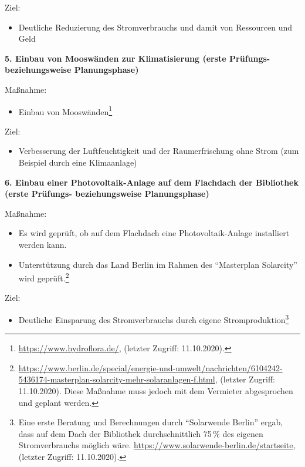 \documentclass[a4paper,
fontsize=11pt,
oneside,
numbers=noperiodatend,
parskip=half-,
bibliography=totoc,
final
]{scrartcl}
\begin{document}
Ziel:

\begin{itemize}[itemsep=-5pt]

\item
  Deutliche Reduzierung des Stromverbrauchs und damit von Ressourcen und
  Geld
\end{itemize}

\textbf{5. Einbau von Mooswänden zur Klimatisierung (erste Prüfungs-
beziehungsweise Planungsphase)}

Maßnahme:

\begin{itemize}[itemsep=-5pt]

\item
  Einbau von Mooswänden\footnote{\url{https://www.hydroflora.de/},
    (letzter Zugriff: 11.10.2020).}
\end{itemize}

Ziel:

\begin{itemize}[itemsep=-5pt]

\item
  Verbesserung der Luftfeuchtigkeit und der Raumerfrischung ohne Strom
  (zum Beispiel durch eine Klimaanlage)
\end{itemize}

\textbf{6. Einbau einer Photovoltaik-Anlage auf dem Flachdach der
Bibliothek (erste Prüfungs- beziehungsweise Planungsphase)}

Maßnahme:

\begin{itemize}[itemsep=-5pt]

\item
  Es wird geprüft, ob auf dem Flachdach eine Photovoltaik-Anlage
  installiert werden kann.
\item
  Unterstützung durch das Land Berlin im Rahmen des \enquote{Masterplan
  Solarcity} wird geprüft.\footnote{\url{https://www.berlin.de/special/energie-und-umwelt/nachrichten/6104242-5436174-masterplan-solarcity-mehr-solaranlagen-f.html},
    (letzter Zugriff: 11.10.2020). Diese Maßnahme muss jedoch mit dem
    Vermieter abgesprochen und geplant werden.}
\end{itemize}

Ziel:

\begin{itemize}[itemsep=-5pt]

\item
  Deutliche Einsparung des Stromverbrauchs durch eigene
  Stromproduktion\footnote{Eine erste Beratung und Berechnungen durch
    \enquote{Solarwende Berlin} ergab, dass auf dem Dach der Bibliothek
    durchschnittlich 75\,\% des eigenen Stromverbrauchs möglich wäre.
    \url{https://www.solarwende-berlin.de/startseite}, (letzter Zugriff:
    11.10.2020).}
\end{itemize}
\end{document}
